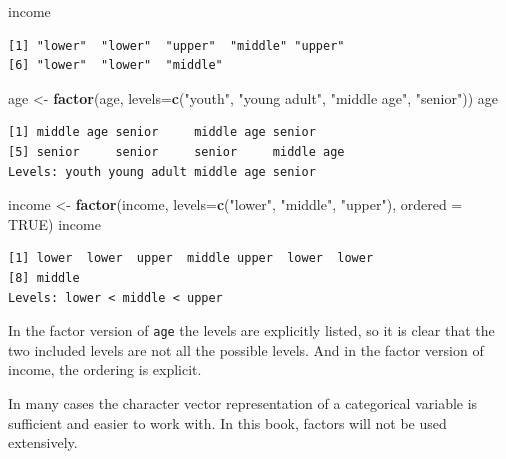 \documentclass[
]{krantz}
\makeatletter
\newenvironment{Shaded}{\begin{snugshade}}{\end{snugshade}}
\newcommand{\DataTypeTok}[1]{\textcolor[rgb]{0.27,0.27,0.27}{#1}}
\newcommand{\KeywordTok}[1]{\textcolor[rgb]{0.27,0.27,0.27}{\textbf{#1}}}
\newcommand{\NormalTok}[1]{#1}
\newcommand{\OtherTok}[1]{\textcolor[rgb]{0.37,0.37,0.37}{#1}}
\newcommand{\StringTok}[1]{\textcolor[rgb]{0.5,0.5,0.5}{#1}}
\newenvironment{kframe}{%
\medskip{}
\setlength{\fboxsep}{.8em}
 \def\at@end@of@kframe{}%
 \ifinner\ifhmode%
  \def\at@end@of@kframe{\end{minipage}}%
  \begin{minipage}{\columnwidth}%
 \fi\fi%
 \def\FrameCommand##1{\hskip\@totalleftmargin \hskip-\fboxsep
 \colorbox{shadecolor}{##1}\hskip-\fboxsep
     \hskip-\linewidth \hskip-\@totalleftmargin \hskip\columnwidth}%
 \MakeFramed {\advance\hsize-\width
   \@totalleftmargin\z@ \linewidth\hsize
   \@setminipage}}%
 {\par\unskip\endMakeFramed%
 \at@end@of@kframe}
\renewenvironment{Shaded}{\begin{kframe}}{\end{kframe}}
\makeatother
\begin{document}
\begin{Shaded}
\begin{Highlighting}[]
\NormalTok{income}
\end{Highlighting}
\end{Shaded}

\begin{verbatim}
[1] "lower"  "lower"  "upper"  "middle" "upper" 
[6] "lower"  "lower"  "middle"
\end{verbatim}

\begin{Shaded}
\begin{Highlighting}[]
\NormalTok{age \textless{}{-}}\StringTok{ }\KeywordTok{factor}\NormalTok{(age, }\DataTypeTok{levels=}\KeywordTok{c}\NormalTok{(}\StringTok{"youth"}\NormalTok{, }\StringTok{"young adult"}\NormalTok{, }\StringTok{"middle age"}\NormalTok{,}
                            \StringTok{"senior"}\NormalTok{))}
\NormalTok{age}
\end{Highlighting}
\end{Shaded}

\begin{verbatim}
[1] middle age senior     middle age senior    
[5] senior     senior     senior     middle age
Levels: youth young adult middle age senior
\end{verbatim}

\begin{Shaded}
\begin{Highlighting}[]
\NormalTok{income \textless{}{-}}\StringTok{ }\KeywordTok{factor}\NormalTok{(income, }\DataTypeTok{levels=}\KeywordTok{c}\NormalTok{(}\StringTok{"lower"}\NormalTok{, }\StringTok{"middle"}\NormalTok{, }\StringTok{"upper"}\NormalTok{),}
                 \DataTypeTok{ordered =} \OtherTok{TRUE}\NormalTok{)}
\NormalTok{income}
\end{Highlighting}
\end{Shaded}

\begin{verbatim}
[1] lower  lower  upper  middle upper  lower  lower 
[8] middle
Levels: lower < middle < upper
\end{verbatim}

In the factor version of \texttt{age} the levels are explicitly listed, so it is clear that the two included levels are not all the possible levels. And in the factor version of income, the ordering is explicit.

In many cases the character vector representation of a categorical variable is sufficient and easier to work with. In this book, factors will not be used extensively.
\end{document}
